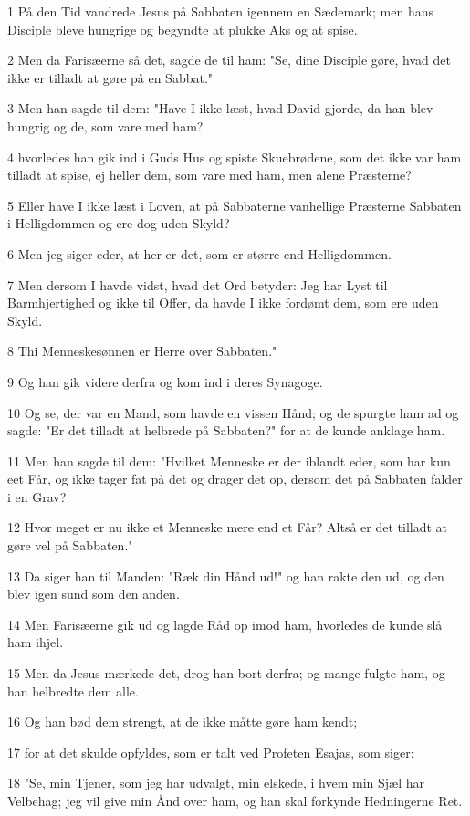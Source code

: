 \par 1 På den Tid vandrede Jesus på Sabbaten igennem en Sædemark; men hans Disciple bleve hungrige og begyndte at plukke Aks og at spise.
\par 2 Men da Farisæerne så det, sagde de til ham: "Se, dine Disciple gøre, hvad det ikke er tilladt at gøre på en Sabbat."
\par 3 Men han sagde til dem: "Have I ikke læst, hvad David gjorde, da han blev hungrig og de, som vare med ham?
\par 4 hvorledes han gik ind i Guds Hus og spiste Skuebrødene, som det ikke var ham tilladt at spise, ej heller dem, som vare med ham, men alene Præsterne?
\par 5 Eller have I ikke læst i Loven, at på Sabbaterne vanhellige Præsterne Sabbaten i Helligdommen og ere dog uden Skyld?
\par 6 Men jeg siger eder, at her er det, som er større end Helligdommen.
\par 7 Men dersom I havde vidst, hvad det Ord betyder: Jeg har Lyst til Barmhjertighed og ikke til Offer, da havde I ikke fordømt dem, som ere uden Skyld.
\par 8 Thi Menneskesønnen er Herre over Sabbaten."
\par 9 Og han gik videre derfra og kom ind i deres Synagoge.
\par 10 Og se, der var en Mand, som havde en vissen Hånd; og de spurgte ham ad og sagde: "Er det tilladt at helbrede på Sabbaten?" for at de kunde anklage ham.
\par 11 Men han sagde til dem: "Hvilket Menneske er der iblandt eder, som har kun eet Får, og ikke tager fat på det og drager det op, dersom det på Sabbaten falder i en Grav?
\par 12 Hvor meget er nu ikke et Menneske mere end et Får? Altså er det tilladt at gøre vel på Sabbaten."
\par 13 Da siger han til Manden: "Ræk din Hånd ud!" og han rakte den ud, og den blev igen sund som den anden.
\par 14 Men Farisæerne gik ud og lagde Råd op imod ham, hvorledes de kunde slå ham ihjel.
\par 15 Men da Jesus mærkede det, drog han bort derfra; og mange fulgte ham, og han helbredte dem alle.
\par 16 Og han bød dem strengt, at de ikke måtte gøre ham kendt;
\par 17 for at det skulde opfyldes, som er talt ved Profeten Esajas, som siger:
\par 18 "Se, min Tjener, som jeg har udvalgt, min elskede, i hvem min Sjæl har Velbehag; jeg vil give min Ånd over ham, og han skal forkynde Hedningerne Ret.
